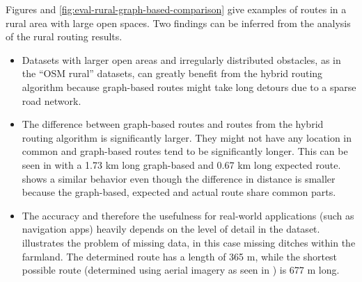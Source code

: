 			\noindent
			Figures  and \ref{fig:eval-rural-graph-based-comparison} give examples of routes in a rural area with large open spaces.
			Two findings can be inferred from the analysis of the rural routing results.
			
			\begin{itemize}
				\item Datasets with larger open areas and irregularly distributed obstacles, as in the \enquote{OSM rural} datasets, can greatly benefit from the hybrid routing algorithm because graph-based routes might take long detours due to a sparse road network.
				\item The difference between graph-based routes and routes from the hybrid routing algorithm is significantly larger.
				They might not have any location in common and graph-based routes tend to be significantly longer.
				This can be seen in  with a 1.73 km long graph-based and 0.67 km long expected route.
				 shows a similar behavior even though the difference in distance is smaller because the graph-based, expected and actual route share common parts.
				\item The accuracy and therefore the usefulness for real-world applications (such as navigation apps) heavily depends on the level of detail in the dataset.
				 illustrates the problem of missing data, in this case missing ditches within the farmland.
				The determined route has a length of 365 m, while the shortest possible route (determined using aerial imagery as seen in ) is 677 m long.
			\end{itemize}
			
